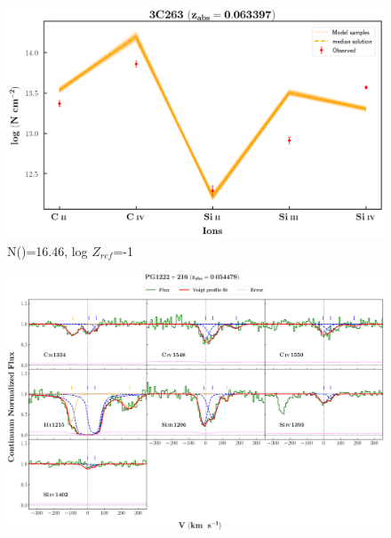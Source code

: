 \documentclass[12pt]{report}
\newcommand\ion[2]{\text{#1\,\textsc{\lowercase{#2}}}}
\begin{document}
\begin{figure}[!htbp]
    \centering
    \includegraphics[width=1\linewidth]{Ionisation-Modelling-Plots/3c263-z=0.063397-compIV_logZ=-1.png}
    \caption{N(\ion{H}{i})=16.46, log $Z_{ref}$=-1}
\end{figure}



\newpage

\begin{landscape}

\begin{figure}
    \centering
    \vspace{-20mm}
    \hspace*{-35mm}
    \includegraphics[width=1.25\linewidth]{System-Plots/PG1222+216_z=0.054479_sys_plot.png}
\end{figure}

\end{landscape}
\end{document}
